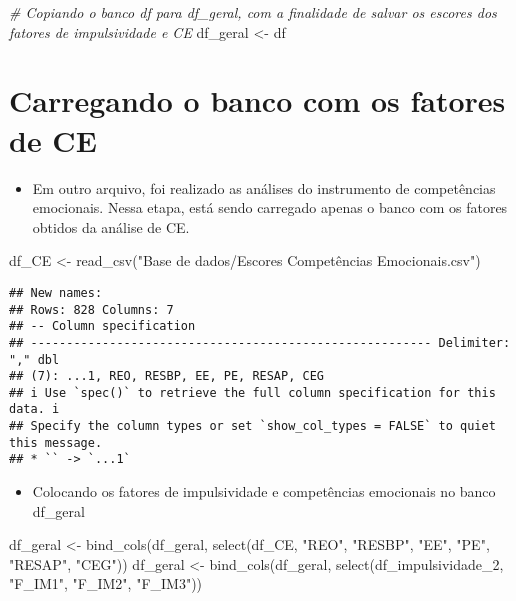 \documentclass[
]{article}
\newenvironment{Shaded}{\begin{snugshade}}{\end{snugshade}}
\newcommand{\CommentTok}[1]{\textcolor[rgb]{0.56,0.35,0.01}{\textit{#1}}}
\newcommand{\FunctionTok}[1]{\textcolor[rgb]{0.00,0.00,0.00}{#1}}
\newcommand{\NormalTok}[1]{#1}
\newcommand{\OtherTok}[1]{\textcolor[rgb]{0.56,0.35,0.01}{#1}}
\newcommand{\StringTok}[1]{\textcolor[rgb]{0.31,0.60,0.02}{#1}}
\providecommand{\tightlist}{%
  \setlength{\itemsep}{0pt}\setlength{\parskip}{0pt}}
\begin{document}
\begin{Shaded}
\begin{Highlighting}[]
\CommentTok{\# Copiando o banco df para df\_geral, com a finalidade de salvar os escores dos fatores de impulsividade e CE}
\NormalTok{df\_geral }\OtherTok{\textless{}{-}}\NormalTok{ df}
\end{Highlighting}
\end{Shaded}

\hypertarget{carregando-o-banco-com-os-fatores-de-ce}{%
\section{Carregando o banco com os fatores de
CE}\label{carregando-o-banco-com-os-fatores-de-ce}}

\begin{itemize}
\tightlist
\item
  Em outro arquivo, foi realizado as análises do instrumento de
  competências emocionais. Nessa etapa, está sendo carregado apenas o
  banco com os fatores obtidos da análise de CE.
\end{itemize}

\begin{Shaded}
\begin{Highlighting}[]
\NormalTok{df\_CE }\OtherTok{\textless{}{-}} \FunctionTok{read\_csv}\NormalTok{(}\StringTok{"Base de dados/Escores Competências Emocionais.csv"}\NormalTok{)}
\end{Highlighting}
\end{Shaded}

\begin{verbatim}
## New names:
## Rows: 828 Columns: 7
## -- Column specification
## -------------------------------------------------------- Delimiter: "," dbl
## (7): ...1, REO, RESBP, EE, PE, RESAP, CEG
## i Use `spec()` to retrieve the full column specification for this data. i
## Specify the column types or set `show_col_types = FALSE` to quiet this message.
## * `` -> `...1`
\end{verbatim}

\begin{itemize}
\tightlist
\item
  Colocando os fatores de impulsividade e competências emocionais no
  banco df\_geral
\end{itemize}

\begin{Shaded}
\begin{Highlighting}[]
\NormalTok{df\_geral }\OtherTok{\textless{}{-}} \FunctionTok{bind\_cols}\NormalTok{(df\_geral, }\FunctionTok{select}\NormalTok{(df\_CE, }\StringTok{"REO"}\NormalTok{, }\StringTok{"RESBP"}\NormalTok{, }\StringTok{"EE"}\NormalTok{, }\StringTok{"PE"}\NormalTok{, }\StringTok{"RESAP"}\NormalTok{, }\StringTok{"CEG"}\NormalTok{))}
\NormalTok{df\_geral }\OtherTok{\textless{}{-}} \FunctionTok{bind\_cols}\NormalTok{(df\_geral, }\FunctionTok{select}\NormalTok{(df\_impulsividade\_2, }\StringTok{"F\_IM1"}\NormalTok{, }\StringTok{"F\_IM2"}\NormalTok{, }\StringTok{"F\_IM3"}\NormalTok{))}
\end{Highlighting}
\end{Shaded}
\end{document}
